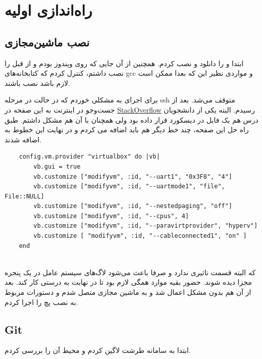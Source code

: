 \documentclass[12pt]{article}
\begin{document}
\KashidaOff


\section{راه‌اندازی اولیه}

\subsection{نصب ماشین‌مجازی}
ابتدا  و  را دانلود و نصب کردم. همچنین از آن جایی که روی ویندوز بودم و از قبل  را نصب داشتم، کنترل کردم که کتابخانه‌های gcc و مواردی نظیر این که بعدا ممکن است لازم باشد نصب باشند.


برای اجرای  به مشکلی خوردم که در حالت   در مرحله ssh متوقف می‌شد. بعد از جست‌وجو در اینترنت به این صفحه در  \href{https://stackoverflow.com/questions/64102520/vagrant-freezes-timeouts-at-ssh-auth-method-private-key}{StackOverflow} رسیدم. البته یکی از دانشجویان درس‌ هم یک فایل  در دیسکورد قرار داده بود ولی همچنان با آن هم مشکل داشتم. طبق راه حل این صفحه، چند خط دیگر هم باید اضافه می کردم و در نهایت این خطوط به  اضافه شدند.


\begin{latin}
\begin{verbatim}
	config.vm.provider "virtualbox" do |vb|
		vb.gui = true
		vb.customize ["modifyvm", :id, "--uart1", "0x3F8", "4"]
		vb.customize ["modifyvm", :id, "--uartmode1", "file", File::NULL]
		vb.customize ["modifyvm", :id, "--nestedpaging", "off"]
		vb.customize ["modifyvm", :id, "--cpus", 4]
		vb.customize ["modifyvm", :id, "--paravirtprovider", "hyperv"]
		vb.customize [ "modifyvm", :id, "--cableconnected1", "on" ]
	end
	
\end{verbatim} 
\end{latin}

که البته قسمت  تاثیری ندارد و صرفا باعث می‌شود لاگ‌های سیستم عامل در یک پنجره مجزا دیده‌ شوند. حضور بقیه موارد همگی لازم بود تا در نهایت  به درستی کار کند. بعد از آن  هم بدون مشکل اعمال شد و به ماشین مجازی متصل شدم و دستورات مربوط به نصب پچ را اجرا کردم.


\subsection{Git}

ابتدا به سامانه طرشت لاگین کردم و محیط آن را بررسی کردم.
\end{document}
